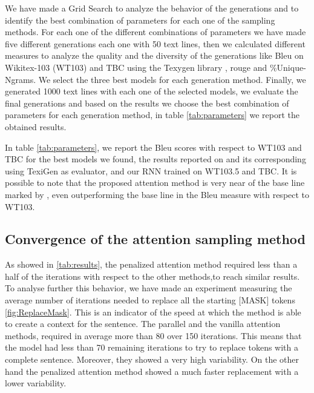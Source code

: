 \documentclass[10pt,twocolumn,letterpaper]{article}
\begin{document}

We have made a Grid Search to analyze the behavior of the generations and to identify the best combination of parameters for each one of the sampling methods.
For each one of the different combinations of parameters we have made five different generations each one with 50 text lines,
then we calculated different measures to analyze the quality and the diversity of the generations like
Bleu on Wikitex-103 (WT103) and TBC using the Texygen library \cite{texygen}, rouge and \%Unique-Ngrams. We select the three best models for each
generation method. Finally, we generated 1000 text lines with each one
of the selected models, we evaluate the final generations and based on the results we choose the best combination of
parameters for each generation method, in table \ref{tab:parameters} we report the obtained results.

In table \ref{tab:parameters}, we report the Bleu scores with respect to WT103 and TBC for the best models we found,
the results reported on \cite{wang2019bert} and its corresponding using TexiGen as evaluator, and our RNN trained on WT103.5 and TBC.
It is possible to note that the proposed attention method is very near of the base line marked by \cite{wang2019bert},
even outperforming the base line in the Bleu measure with respect to WT103.


\subsection{Convergence of the attention sampling method}
As showed in \ref{tab:results}, the penalized attention method required less than a half
of the iterations with respect to the other methods,to reach similar results.
To analyse further this behavior, we have made an experiment measuring the average number
of iterations needed to replace all the starting [MASK] tokens \ref{fig:ReplaceMask}.
This is an indicator of the speed at which the method is able to create a context for the sentence.
The parallel and the vanilla attention methods, required in average more than 80 over 150 iterations.
This means that the model had less than 70 remaining iterations to try to replace tokens with a complete sentence.
Moreover, they showed a very high variability.
On the other hand the penalized attention method showed a much faster replacement with a lower variability.
\end{document}
